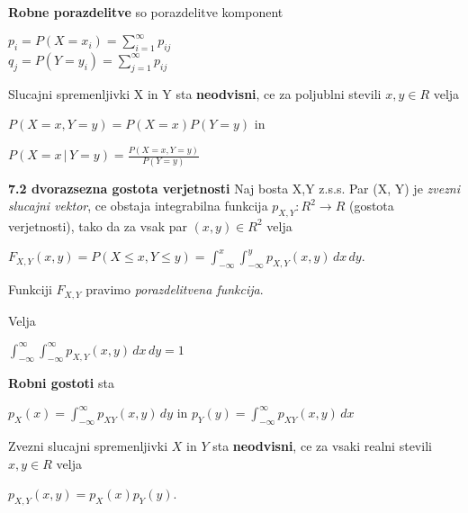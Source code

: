 \documentclass{article}
\begin{document}
\begin{multicols}{2}
	\textbf{Robne porazdelitve} so porazdelitve komponent\\
	\begin{center}
		\begin{math}
			p_i = P(X = x_i) = \sum_{i = 1}^{\infty} p_{ij}
		\end{math}\\
		\begin{math}
			q_j = P(Y = y_i) = \sum_{j = 1}^{\infty} p_{ij}
		\end{math}
	\end{center}
	Slucajni spremenljivki X in Y sta \textbf{neodvisni},
	ce za poljublni stevili $x,y \in R$ velja
	\begin{center}
		\begin{math}
			P(X = x, Y = y) = P(X = x)P(Y = y)
		\end{math} in
	\end{center}
	\begin{center}
		\begin{math}
			P(X = x\, |\, Y = y) = \frac{P(X = x, Y = y)}{P(Y = y)}
		\end{math}
	\end{center}

	\textbf{7.2 dvorazsezna gostota verjetnosti}
	Naj bosta X,Y z.s.s. Par (X, Y) je \textit{zvezni slucajni vektor},
	ce obstaja integrabilna funkcija $p_{X,Y}: R^2 \rightarrow R$ (gostota verjetnosti), tako da za
	vsak par $(x,y) \in R^2$ velja
	\begin{center}
		\begin{math}
			F_{X,Y}(x, y) = P(X \leq x, Y \leq y) = \int_{-\infty}^{x}\int_{-\infty}^{y} p_{X,Y}(x,y)\,dx\,dy
		\end{math}.
	\end{center}
	\begin{small}
		Funkciji $F_{X,Y}$ pravimo \textit{porazdelitvena funkcija}.
	\end{small}
	Velja
	\begin{center}
		\begin{math}
			\int_{-\infty}^{\infty}\int_{-\infty}^{\infty} p_{X,Y}(x,y)\,dx\,dy = 1
		\end{math}
	\end{center}
	\textbf{Robni gostoti} sta
	\begin{center}
		\begin{math}
			p_X(x) = \int_{-\infty}^{\infty} p_{XY}(x,y)\, dy
		\end{math} in
		\begin{math}
			p_Y(y) = \int_{-\infty}^{\infty} p_{XY}(x,y)\, dx
		\end{math}
	\end{center}
	Zvezni slucajni spremenljivki $X$ in $Y$ sta \textbf{neodvisni}, ce
	za vsaki realni stevili $x, y \in R$ velja
	\begin{center}
		\begin{math}
			p_{X,Y}(x,y) = p_X(x)p_Y(y)
		\end{math}.
	\end{center}


\end{multicols}
\end{document}
